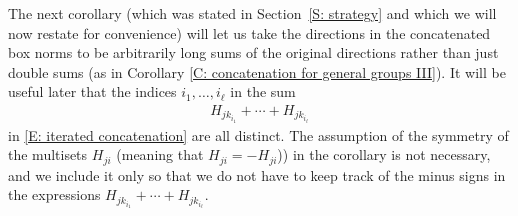 \documentclass[11pt]{amsart}
\theoremstyle{definition}
\begin{document}
The next corollary (which was stated in Section~\ref{S: strategy} and which we will now restate for convenience) will let us take the directions in the concatenated box norms to be arbitrarily long sums of the original directions rather than just double sums (as in Corollary \ref{C: concatenation for general groups III}).
\iteratedconcatenationofboxnorms*
It will be useful later that the indices $i_1, \ldots, i_{\ell}$ in the sum
\begin{align*}
    H_{j k_{i_1}}+\cdots + H_{j k_{i_{\ell}}}
\end{align*}
in \eqref{E: iterated concatenation} are all distinct.  The assumption of the symmetry of the multisets $H_{ji}$ (meaning that $H_{ji}=-H_{ji}$)) in the corollary is not necessary, and we include it only so that we do not have to keep track of the minus signs in the expressions $H_{j k_{i_1}}+\cdots + H_{j k_{i_{\ell}}}$.
\end{document}
